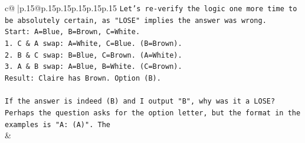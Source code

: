 \documentclass{article}
\begin{document}
{\begin{supertabular}{c@{$\;$}|p{.15\linewidth}@{}p{.15\linewidth}p{.15\linewidth}p{.15\linewidth}p{.15\linewidth}p{.15\linewidth}}
{{{\texttt{Let's re{-}verify the logic one more time to be absolutely certain, as "LOSE" implies the answer was wrong.} \\
\texttt{Start: A=Blue, B=Brown, C=White.} \\
\texttt{1. C \& A swap: A=White, C=Blue. (B=Brown).} \\
\texttt{2. B \& C swap: B=Blue, C=Brown. (A=White).} \\
\texttt{3. A \& B swap: A=Blue, B=White. (C=Brown).} \\
\texttt{Result: Claire has Brown. Option (B).} \\
\\ 
\texttt{If the answer is indeed (B) and I output "B", why was it a LOSE?} \\
\texttt{Perhaps the question asks for the option letter, but the format in the examples is "A: (A)". The} \\
            }
        }
    }
    & \\ \\

\end{supertabular}
}
\end{document}
